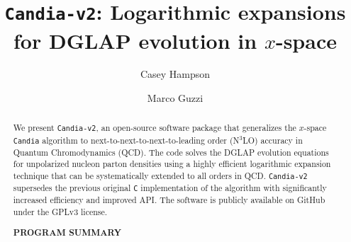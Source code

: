 \documentclass[preprint,12pt]{elsarticle}
\begin{document}
\begin{frontmatter}



\title{\texttt{Candia-v2}: Logarithmic expansions for DGLAP evolution in $x$-space}


\author[a]{Casey Hampson}
\author[a]{Marco Guzzi}

\address[a]{Department of Physics, Kennesaw State University, Kennesaw, GA 30144, USA}

\begin{abstract}

We present \texttt{Candia-v2}, an open-source software package that generalizes the $x$-space \texttt{Candia} algorithm to next-to-next-to-next-to-leading order (N$^{3}$LO) accuracy in Quantum Chromodynamics (QCD). The code solves the DGLAP evolution equations for unpolarized nucleon parton densities using a highly efficient logarithmic expansion technique that can be systematically extended to all orders in QCD\@.
%
\texttt{Candia-v2} supersedes the previous original \texttt{C} implementation of the algorithm with significantly increased efficiency and improved API\@. The software is publicly available on GitHub under the GPLv3 license.

\pagebreak

\noindent \textbf{PROGRAM SUMMARY}


\end{abstract}
\end{frontmatter}
\end{document}
